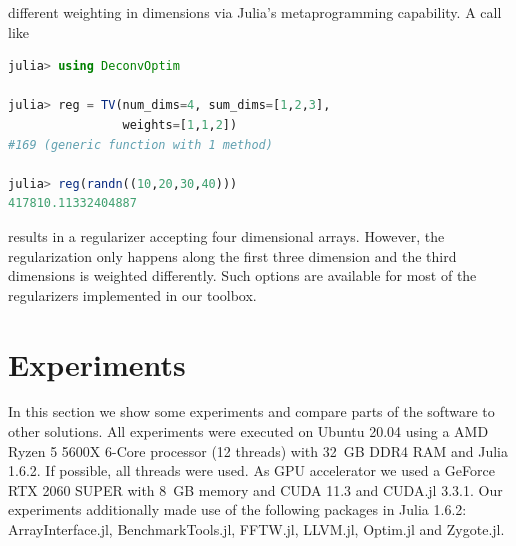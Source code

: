 \documentclass{juliacon}
\begin{document}
        different weighting in dimensions via Julia's metaprogramming capability.
        A call like 
        \begin{lstlisting}[language = Julia]
julia> using DeconvOptim

julia> reg = TV(num_dims=4, sum_dims=[1,2,3],
                weights=[1,1,2])
#169 (generic function with 1 method)

julia> reg(randn((10,20,30,40)))
417810.11332404887
        \end{lstlisting}
        results in a regularizer accepting four dimensional arrays. However, the regularization only happens along the first three dimension
        and the third dimensions is weighted differently.
        Such options are available for most of the regularizers implemented in our toolbox.

\section{Experiments}
    In this section we show some experiments and compare parts of the software to other solutions.
All experiments were executed on Ubuntu 20.04 using a AMD Ryzen 5 5600X 6-Core processor (12 threads) with \SI{32}{GB} DDR4 RAM and Julia 1.6.2.
    If possible, all threads were used.
    As GPU accelerator we used a GeForce RTX 2060 SUPER with \SI{8}{GB} memory and CUDA 11.3 and CUDA.jl 3.3.1.
    Our experiments additionally made use of the following packages in Julia 1.6.2: ArrayInterface.jl\cite{DifferentialEquations.jl-2017}, 
    BenchmarkTools.jl\cite{BenchmarkTools.jl-2016}, FFTW.jl\cite{FFTW05}, LLVM.jl\cite{LLVM.jl-2017}, Optim.jl\cite{mogensen2018optim}
    and  Zygote.jl\cite{Zygote.jl-2018}. 
\end{document}
